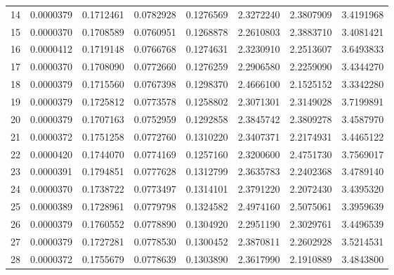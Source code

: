 \documentclass[11pt]{scrartcl}
\theoremstyle{dotlessP}
\theoremstyle{dotlessN}
\theoremstyle{dotN}
\begin{document}
\begin{table}[H]
{\begin{tabular}{c|c|c|c|c|c|c|c}
14    & 0.0000379 & 0.1712461       & 0.0782928     & 0.1276569           & 2.3272240          & 2.3807909        & 3.4191968              \\
15    & 0.0000370 & 0.1708589       & 0.0760951     & 0.1268878           & 2.2610803          & 2.3883710        & 3.4081421              \\
16    & 0.0000412 & 0.1719148       & 0.0766768     & 0.1274631           & 2.3230910          & 2.2513607        & 3.6493833              \\
17    & 0.0000370 & 0.1708090       & 0.0772660     & 0.1276259           & 2.2906580          & 2.2259090        & 3.4344270              \\
18    & 0.0000379 & 0.1715560       & 0.0767398     & 0.1298370           & 2.4666100          & 2.1525152        & 3.3342280              \\
19    & 0.0000379 & 0.1725812       & 0.0773578     & 0.1258802           & 2.3071301          & 2.3149028        & 3.7199891              \\
20    & 0.0000379 & 0.1707163       & 0.0752959     & 0.1292858           & 2.3845742          & 2.3809278        & 3.4587970              \\
21    & 0.0000372 & 0.1751258       & 0.0772760     & 0.1310220           & 2.3407371          & 2.2174931        & 3.4465122              \\
22    & 0.0000420 & 0.1744070       & 0.0774169     & 0.1257160           & 2.3200600          & 2.4751730        & 3.7569017              \\
23    & 0.0000391 & 0.1794851       & 0.0777628     & 0.1312799           & 2.3635783          & 2.2402368        & 3.4789140              \\
24    & 0.0000370 & 0.1738722       & 0.0773497     & 0.1314101           & 2.3791220          & 2.2072430        & 3.4395320              \\
25    & 0.0000389 & 0.1728961       & 0.0779798     & 0.1324582           & 2.4974160          & 2.5075061        & 3.3959639              \\
26    & 0.0000379 & 0.1760552       & 0.0778890     & 0.1304920           & 2.2951190          & 2.3029761        & 3.4496539              \\
27    & 0.0000379 & 0.1727281       & 0.0778530     & 0.1300452           & 2.3870811          & 2.2602928        & 3.5214531              \\
28    & 0.0000372 & 0.1755679       & 0.0778639     & 0.1303890           & 2.3617990          & 2.1910889        & 3.4843800              \\

\end{tabular}}
\end{table}
\end{document}
